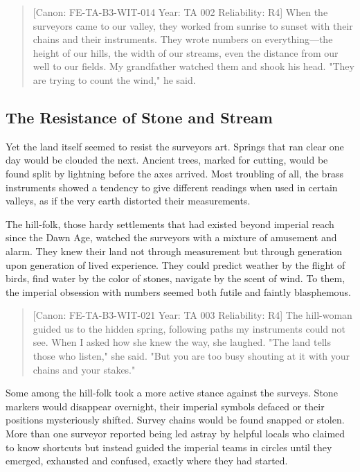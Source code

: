 \begin{quote}
{[}Canon: FE-TA-B3-WIT-014 \textbar{} Year: TA 002 \textbar{}
Reliability: R4{]} When the surveyors came to our valley, they worked
from sunrise to sunset with their chains and their instruments. They
wrote numbers on everything---the height of our hills, the width of our
streams, even the distance from our well to our fields. My grandfather
watched them and shook his head. "They are trying to count the wind," he
said.
\end{quote}

\subsection{The Resistance of Stone and
Stream}\label{the-resistance-of-stone-and-stream}

Yet the land itself seemed to resist the surveyor\textquotesingle s art.
Springs that ran clear one day would be clouded the next. Ancient trees,
marked for cutting, would be found split by lightning before the axes
arrived. Most troubling of all, the brass instruments showed a tendency
to give different readings when used in certain valleys, as if the very
earth distorted their measurements.

The hill-folk, those hardy settlements that had existed beyond imperial
reach since the Dawn Age, watched the surveyors with a mixture of
amusement and alarm. They knew their land not through measurement but
through generation upon generation of lived experience. They could
predict weather by the flight of birds, find water by the color of
stones, navigate by the scent of wind. To them, the imperial obsession
with numbers seemed both futile and faintly blasphemous.

\begin{quote}
{[}Canon: FE-TA-B3-WIT-021 \textbar{} Year: TA 003 \textbar{}
Reliability: R4{]} The hill-woman guided us to the hidden spring,
following paths my instruments could not see. When I asked how she knew
the way, she laughed. "The land tells those who listen," she said. "But
you are too busy shouting at it with your chains and your stakes."
\end{quote}

Some among the hill-folk took a more active stance against the surveys.
Stone markers would disappear overnight, their imperial symbols defaced
or their positions mysteriously shifted. Survey chains would be found
snapped or stolen. More than one surveyor reported being led astray by
helpful locals who claimed to know shortcuts but instead guided the
imperial teams in circles until they emerged, exhausted and confused,
exactly where they had started.

